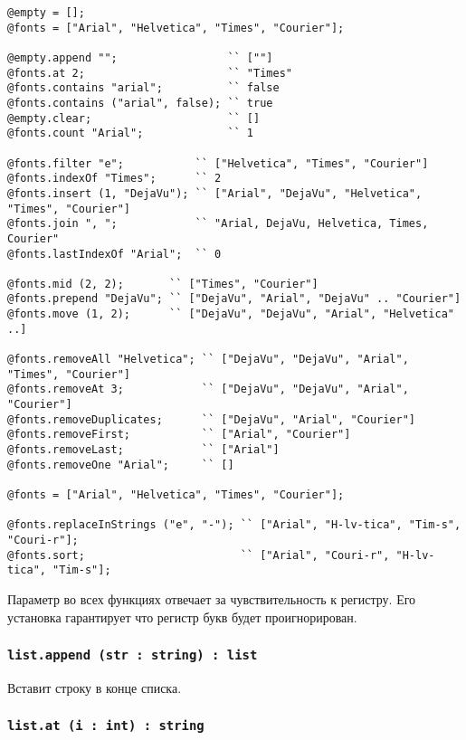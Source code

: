 \begin{lstlisting}[caption=Методы класса list, label=listmethods]
@empty = [];
@fonts = ["Arial", "Helvetica", "Times", "Courier"];

@empty.append "";                 `` [""]
@fonts.at 2;                      `` "Times"
@fonts.contains "arial";          `` false
@fonts.contains ("arial", false); `` true
@empty.clear;                     `` []
@fonts.count "Arial";             `` 1

@fonts.filter "e";           `` ["Helvetica", "Times", "Courier"]
@fonts.indexOf "Times";      `` 2
@fonts.insert (1, "DejaVu"); `` ["Arial", "DejaVu", "Helvetica", "Times", "Courier"]
@fonts.join ", ";            `` "Arial, DejaVu, Helvetica, Times, Courier"
@fonts.lastIndexOf "Arial";  `` 0

@fonts.mid (2, 2);       `` ["Times", "Courier"]
@fonts.prepend "DejaVu"; `` ["DejaVu", "Arial", "DejaVu" .. "Courier"]
@fonts.move (1, 2);      `` ["DejaVu", "DejaVu", "Arial", "Helvetica" ..]

@fonts.removeAll "Helvetica"; `` ["DejaVu", "DejaVu", "Arial", "Times", "Courier"]
@fonts.removeAt 3;            `` ["DejaVu", "DejaVu", "Arial", "Courier"]
@fonts.removeDuplicates;      `` ["DejaVu", "Arial", "Courier"]
@fonts.removeFirst;           `` ["Arial", "Courier"]
@fonts.removeLast;            `` ["Arial"]
@fonts.removeOne "Arial";     `` []

@fonts = ["Arial", "Helvetica", "Times", "Courier"];

@fonts.replaceInStrings ("e", "-"); `` ["Arial", "H-lv-tica", "Tim-s", "Couri-r"];
@fonts.sort;                        `` ["Arial", "Couri-r", "H-lv-tica", "Tim-s"];
\end{lstlisting}

Параметр  во всех функциях отвечает за чувствительность к регистру. Его установка гарантирует что регистр букв будет проигнорирован.

\subsubsection{\lstinline|list.append (str : string) : list|}

Вставит строку  в конце списка.

\subsubsection{\lstinline|list.at (i : int) : string|}


